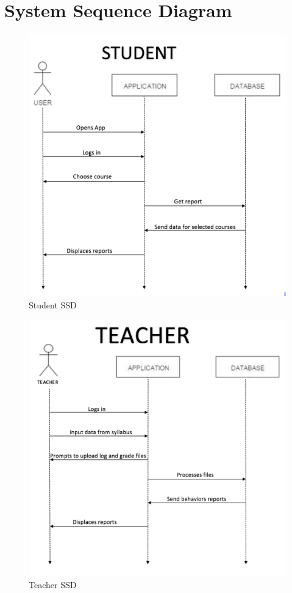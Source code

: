 \documentclass[12pt]{article}
\begin{document}
\section{System Sequence Diagram}
\begin{figure}
\caption{Student SSD}
\includegraphics[width=\textwidth]{img/1} 
\end{figure}
\begin{figure}
	\caption{Teacher SSD}
\includegraphics[width=\textwidth]{img/2.png}
\end{figure}
\pagebreak
\end{document}
